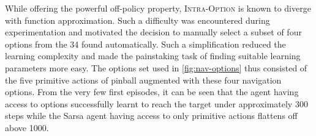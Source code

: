 While offering the powerful off-policy property, \textsc{Intra-Option} is known to diverge with function approximation. Such a difficulty was encountered during experimentation and motivated the decision to manually select a subset of four options from the 34 found automatically. Such a simplification reduced the learning complexity and made the painstaking task of finding suitable learning parameters more easy. The options set used in \ref{fig:nav-options} thus consisted of the five primitive actions of pinball augmented with these four navigation options. From the very few first episodes, it can be seen that the agent having access to options successfully learnt to reach the target under approximately 300 steps while the Sarsa agent having access to only primitive actions flattens off above 1000. 

